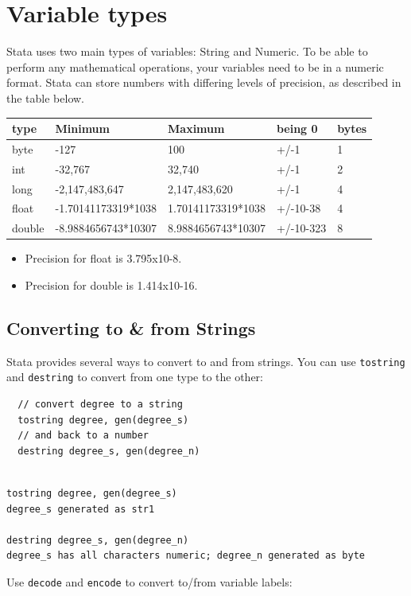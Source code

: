 \documentclass[]{book}
\providecommand{\tightlist}{%
  \setlength{\itemsep}{0pt}\setlength{\parskip}{0pt}}
\begin{document}
\section{Variable types}\label{variable-types}

Stata uses two main types of variables: String and Numeric. To be able
to perform any mathematical operations, your variables need to be in a
numeric format. Stata can store numbers with differing levels of
precision, as described in the table below.

\begin{longtable}[]{@{}lllll@{}}
\toprule
type & Minimum & Maximum & being 0 & bytes\tabularnewline
\midrule
\endhead
byte & -127 & 100 & +/-1 & 1\tabularnewline
int & -32,767 & 32,740 & +/-1 & 2\tabularnewline
long & -2,147,483,647 & 2,147,483,620 & +/-1 & 4\tabularnewline
float & -1.70141173319*1038 & 1.70141173319*1038 & +/-10-38 &
4\tabularnewline
double & -8.9884656743*10307 & 8.9884656743*10307 & +/-10-323 &
8\tabularnewline
\bottomrule
\end{longtable}

\begin{itemize}
\tightlist
\item
  Precision for float is 3.795x10-8.
\item
  Precision for double is 1.414x10-16.
\end{itemize}

\subsection{Converting to \& from
Strings}\label{converting-to-from-strings}

Stata provides several ways to convert to and from strings. You can use
\texttt{tostring} and \texttt{destring} to convert from one type to the
other:

\begin{verbatim}
  // convert degree to a string
  tostring degree, gen(degree_s)
  // and back to a number
  destring degree_s, gen(degree_n)
\end{verbatim}

\begin{verbatim}

tostring degree, gen(degree_s)
degree_s generated as str1

destring degree_s, gen(degree_n)
degree_s has all characters numeric; degree_n generated as byte
\end{verbatim}

Use \texttt{decode} and \texttt{encode} to convert to/from variable
labels:
\end{document}
